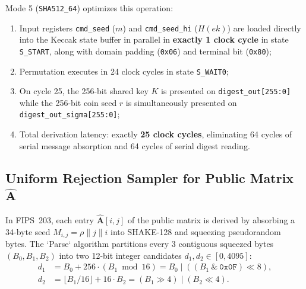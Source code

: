 Mode 5 (\texttt{SHA512\_64}) optimizes this operation:
\begin{enumerate}
    \item Input registers \texttt{cmd\_seed} ($m$) and \texttt{cmd\_seed\_hi} ($H(ek)$) are loaded directly into the Keccak state buffer in parallel in \textbf{exactly 1 clock cycle} in state \texttt{S\_START}, along with domain padding (\texttt{0x06}) and terminal bit (\texttt{0x80});
    \item Permutation executes in 24 clock cycles in state \texttt{S\_WAIT0};
    \item On cycle 25, the 256-bit shared key $K$ is presented on \texttt{digest\_out[255:0]} while the 256-bit coin seed $r$ is simultaneously presented on \texttt{digest\_out\_sigma[255:0]};
    \item Total derivation latency: exactly \textbf{25 clock cycles}, eliminating 64 cycles of serial message absorption and 64 cycles of serial digest reading.
\end{enumerate}

\subsection{Uniform Rejection Sampler for Public Matrix \texorpdfstring{$\hat{\mathbf{A}}$}{A}}
\label{sec:matrix_sampler}

In FIPS~203, each entry $\hat{\mathbf{A}}[i, j]$ of the public matrix is derived by absorbing a 34-byte seed $M_{i, j} = \rho \parallel j \parallel i$ into SHAKE-128 and squeezing pseudorandom bytes. The `Parse` algorithm partitions every 3 contiguous squeezed bytes $(B_0, B_1, B_2)$ into two 12-bit integer candidates $d_1, d_2 \in [0, 4095]$:
\begin{align}
d_1 &= B_0 + 256 \cdot (B_1 \bmod 16) = B_0 \mid ((B_1 \ \& \ \texttt{0x0F}) \ll 8), \label{eq:parse_d1} \\
d_2 &= \lfloor B_1 / 16 \rfloor + 16 \cdot B_2 = (B_1 \gg 4) \mid (B_2 \ll 4). \label{eq:parse_d2}
\end{align}

